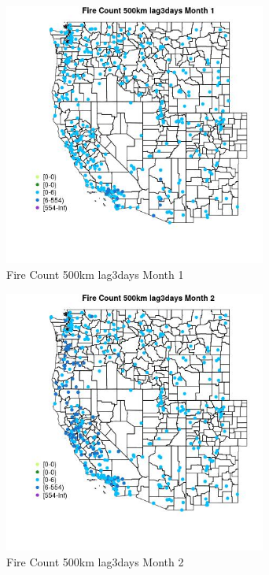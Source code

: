 \begin{figure} 
\centering  
\includegraphics[width=0.77\textwidth]{Code_Outputs/Report_ML_input_PM25_Step4_part_e_de_duplicated_aves_compiled_2019-05-18wNAs_MapObsMo1Fire_Count_500km_lag3days.jpg} 
\caption{\label{fig:Report_ML_input_PM25_Step4_part_e_de_duplicated_aves_compiled_2019-05-18wNAsMapObsMo1Fire_Count_500km_lag3days}Fire Count 500km lag3days Month 1} 
\end{figure} 
 

\clearpage 

\begin{figure} 
\centering  
\includegraphics[width=0.77\textwidth]{Code_Outputs/Report_ML_input_PM25_Step4_part_e_de_duplicated_aves_compiled_2019-05-18wNAs_MapObsMo2Fire_Count_500km_lag3days.jpg} 
\caption{\label{fig:Report_ML_input_PM25_Step4_part_e_de_duplicated_aves_compiled_2019-05-18wNAsMapObsMo2Fire_Count_500km_lag3days}Fire Count 500km lag3days Month 2} 
\end{figure} 
 

